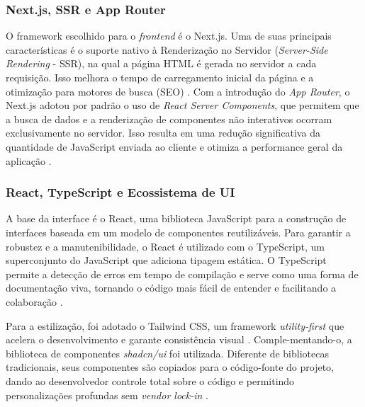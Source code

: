 \subsubsection{Next.js, SSR e App Router}
O framework escolhido para o \textit{frontend} é o Next.js. Uma de suas principais características é o suporte nativo à Renderização no Servidor (\textit{Server-Side Rendering} - SSR), na qual a página HTML é gerada no servidor a cada requisição. Isso melhora o tempo de carregamento inicial da página e a otimização para motores de busca (SEO) \cite{medium2025ssr}. Com a introdução do \textit{App Router}, o Next.js adotou por padrão o uso de \textit{React Server Components}, que permitem que a busca de dados e a renderização de componentes não interativos ocorram exclusivamente no servidor. Isso resulta em uma redução significativa da quantidade de JavaScript enviada ao cliente e otimiza a performance geral da aplicação \cite{nextjs2025servercomponents}.

\subsubsection{React, TypeScript e Ecossistema de UI}
A base da interface é o React, uma biblioteca JavaScript para a construção de interfaces baseada em um modelo de componentes reutilizáveis. Para garantir a robustez e a manutenibilidade, o React é utilizado com o TypeScript, um superconjunto do JavaScript que adiciona tipagem estática. O TypeScript permite a detecção de erros em tempo de compilação e serve como uma forma de documentação viva, tornando o código mais fácil de entender e facilitando a colaboração \cite{dhiwise2024reacttypescript}.

Para a estilização, foi adotado o Tailwind CSS, um framework \textit{utility-first} que acelera o desenvolvimento e garante consistência visual \cite{medium2025cssframeworks}. Comple-mentando-o, a biblioteca de componentes \textit{shadcn/ui} foi utilizada. Diferente de bibliotecas tradicionais, seus componentes são copiados para o código-fonte do projeto, dando ao desenvolvedor controle total sobre o código e permitindo personalizações profundas sem \textit{vendor lock-in} \cite{shadcnui2025docs}.

